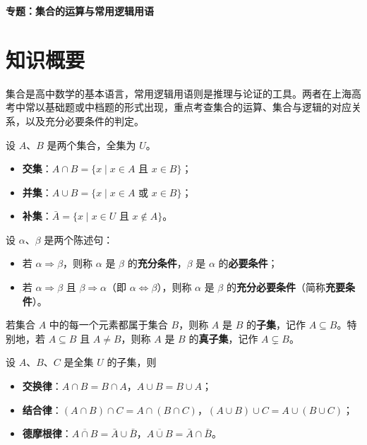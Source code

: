 \documentclass[11pt]{ctexrep}
\begin{document}
\begin{center}
    {\Large\bfseries 专题：集合的运算与常用逻辑用语}
\end{center}

\section*{知识概要}

集合是高中数学的基本语言，常用逻辑用语则是推理与论证的工具。两者在上海高考中常以基础题或中档题的形式出现，重点考查集合的运算、集合与逻辑的对应关系，以及充分必要条件的判定。

\begin{definition}[交集、并集与补集]
    设 $A$、$B$ 是两个集合，全集为 $U$。
    \begin{itemize}
        \item \textbf{交集}：$A \cap B = \{ x \mid x \in A \text{ 且 } x \in B \}$；
        \item \textbf{并集}：$A \cup B = \{ x \mid x \in A \text{ 或 } x \in B \}$；
        \item \textbf{补集}：$\bar{A} = \{ x \mid x \in U \text{ 且 } x \notin A \}$。
    \end{itemize}
\end{definition}

\begin{definition}[充分条件与必要条件]
    设 $\alpha$、$\beta$ 是两个陈述句：
    \begin{itemize}
        \item 若 $\alpha \Rightarrow \beta$，则称 $\alpha$ 是 $\beta$ 的\textbf{充分条件}，$\beta$ 是 $\alpha$ 的\textbf{必要条件}；
        \item 若 $\alpha \Rightarrow \beta$ 且 $\beta \Rightarrow \alpha$（即 $\alpha \Leftrightarrow \beta$），则称 $\alpha$ 是 $\beta$ 的\textbf{充分必要条件}（简称\textbf{充要条件}）。
    \end{itemize}
\end{definition}

\begin{definition}[子集]
    若集合 $A$ 中的每一个元素都属于集合 $B$，则称 $A$ 是 $B$ 的\textbf{子集}，记作 $A \subseteq B$。特别地，若 $A \subseteq B$ 且 $A \neq B$，则称 $A$ 是 $B$ 的\textbf{真子集}，记作 $A \subsetneq B$。
\end{definition}

\begin{property}[集合运算的基本律]
    设 $A$、$B$、$C$ 是全集 $U$ 的子集，则
    \begin{itemize}
        \item \textbf{交换律}：$A \cap B = B \cap A$，$A \cup B = B \cup A$；
        \item \textbf{结合律}：$(A \cap B) \cap C = A \cap (B \cap C)$，$(A \cup B) \cup C = A \cup (B \cup C)$；
        \item \textbf{德摩根律}：$\overline{A \cap B} = \bar{A} \cup \bar{B}$，$\overline{A \cup B} = \bar{A} \cap \bar{B}$。
    \end{itemize}
\end{property}
\end{document}
